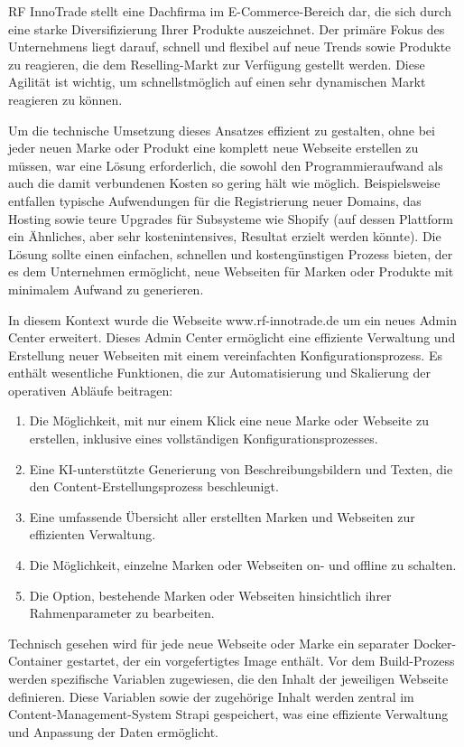 RF InnoTrade stellt eine Dachfirma im E-Commerce-Bereich dar, die sich durch eine starke Diversifizierung Ihrer Produkte auszeichnet. Der primäre Fokus des Unternehmens liegt darauf, schnell und flexibel auf neue Trends sowie Produkte zu reagieren, die dem Reselling-Markt zur Verfügung gestellt werden. Diese Agilität ist wichtig, um schnellstmöglich auf einen sehr dynamischen Markt reagieren zu können.

Um die technische Umsetzung dieses Ansatzes effizient zu gestalten, ohne bei jeder neuen Marke oder Produkt eine komplett neue Webseite erstellen zu müssen, war eine Lösung erforderlich, die sowohl den Programmieraufwand als auch die damit verbundenen Kosten so gering hält wie möglich. Beispielsweise entfallen typische Aufwendungen für die Registrierung neuer Domains, das Hosting sowie teure Upgrades für Subsysteme wie Shopify (auf dessen Plattform ein Ähnliches, aber sehr kostenintensives, Resultat erzielt werden könnte). Die Lösung sollte einen einfachen, schnellen und kostengünstigen Prozess bieten, der es dem Unternehmen ermöglicht, neue Webseiten für Marken oder Produkte mit minimalem Aufwand zu generieren.

In diesem Kontext wurde die Webseite www.rf-innotrade.de um ein neues Admin Center erweitert. Dieses Admin Center ermöglicht eine effiziente Verwaltung und Erstellung neuer Webseiten mit einem vereinfachten Konfigurationsprozess. Es enthält wesentliche Funktionen, die zur Automatisierung und Skalierung der operativen Abläufe beitragen:

\begin{enumerate}
    \item Die Möglichkeit, mit nur einem Klick eine neue Marke oder Webseite zu erstellen, inklusive eines vollständigen Konfigurationsprozesses.
    \item Eine KI-unterstützte Generierung von Beschreibungsbildern und Texten, die den Content-Erstellungsprozess beschleunigt.
    \item Eine umfassende Übersicht aller erstellten Marken und Webseiten zur effizienten Verwaltung.
    \item Die Möglichkeit, einzelne Marken oder Webseiten on- und offline zu schalten.
    \item Die Option, bestehende Marken oder Webseiten hinsichtlich ihrer Rahmenparameter zu bearbeiten.
\end{enumerate}

Technisch gesehen wird für jede neue Webseite oder Marke ein separater Docker-Container gestartet, der ein vorgefertigtes Image enthält. Vor dem Build-Prozess werden spezifische Variablen zugewiesen, die den Inhalt der jeweiligen Webseite definieren. Diese Variablen sowie der zugehörige Inhalt werden zentral im Content-Management-System Strapi gespeichert, was eine effiziente Verwaltung und Anpassung der Daten ermöglicht.


